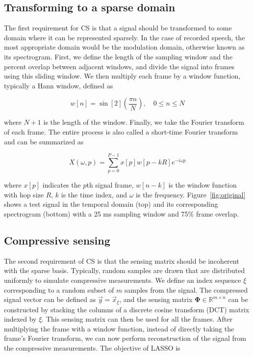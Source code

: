 \documentclass[10pt,a4paper,twoside]{article}
\begin{document}
\subsection{Transforming to a sparse domain}\label{ssec:sparse}
The first requirement for CS is that a signal should be transformed to some domain where it can be represented sparsely. In the case of recorded speech, the most appropriate domain would be the modulation domain, otherwise known as its spectrogram. First, we define the length of the sampling window and the percent overlap between adjacent windows, and divide the signal into frames using this sliding window. We then multiply each frame by a window function, typically a Hann window, defined as

\begin{equation}\label{eq:hann}
	w[n] = \sin[2](\frac{\pi n}{N}), \quad 0 \leq n \leq N
\end{equation}

\noindent where $N+1$ is the length of the window. Finally, we take the Fourier transform of each frame. The entire process is also called a short-time Fourier transform and can be summarized as

\begin{equation}\label{eq:stft}
	X(\omega, p) = \sum_{p=0}^{P-1} x[p] w[p - kR] e^{-i\omega p}
\end{equation}

\noindent where $x[p]$ indicates the $p$th signal frame, $w[n-k]$ is the window function with hop size $R$, $k$ is the time index, and $\omega$ is the frequency. Figure~\ref{fig:original} shows a test signal in the temporal domain (top) and its corresponding spectrogram (bottom) with a 25 ms sampling window and 75\% frame overlap.

\subsection{Compressive sensing}\label{ssec:cs}
The second requirement of CS is that the sensing matrix should be incoherent with the sparse basis. Typically, random samples are drawn that are distributed uniformly to simulate compressive measurements. We define an index sequence $\xi$ corresponding to a random subset of $m$ samples from the signal. The compressed signal vector can be defined as $\vec{y} = \vec{x}_\xi$, and the sensing matrix $\bm\Phi \in \mathbb{R}^{m \times n}$ can be constructed by stacking the columns of a discrete cosine transform (DCT) matrix indexed by $\xi$. This sensing matrix can then be used for all the frames. After multiplying the frame with a window function, instead of directly taking the frame's Fourier transform, we can now perform reconstruction of the signal from the compressive measurements. The objective of LASSO is
\end{document}
